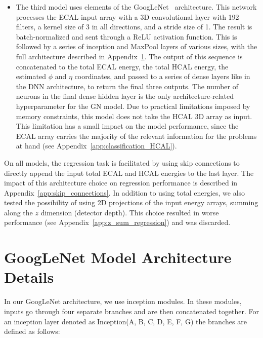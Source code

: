 \begin{itemize}
    \item The third model uses elements of the GoogLeNet~\cite{GoogLeNet} architecture. This network processes the ECAL input array with a 3D convolutional layer with 192 filters, a kernel size of 3 in all directions, and a stride size of 1. The result is batch-normalized and sent through a ReLU activation function. This is followed by a series of inception and MaxPool layers of various sizes, with the full architecture described in Appendix~\ref{app:GoogLeNet}. The output of this sequence is concatenated to the total ECAL energy, the total HCAL energy, the estimated $\phi$ and $\eta$ coordinates, and passed to a series of dense layers like in the DNN architecture, to return the final three outputs. The number of neurons in the final dense hidden layer is the only architecture-related hyperparameter for the GN model. Due to practical limitations imposed by memory constraints, this model does not take the HCAL 3D array as input. This limitation has a small impact on the model performance, since the ECAL array carries the majority of the relevant information for the problems at hand (see Appendix~\ref{app:classification_HCAL}).
\end{itemize}

On all models, the regression task is facilitated by using skip connections to directly append the input total ECAL and HCAL energies to the last layer. The impact of this architecture choice on regression performance is described in Appendix~\ref{app:skip_connections}. In addition to using total energies, we also tested the possibility of using 2D projections of the input energy arrays, summing along the $z$ dimension (detector depth). This choice resulted in worse performance (see Appendix~\ref{app:z_sum_regression}) and was discarded.

\section{GoogLeNet Model Architecture Details}\label{app:GoogLeNet}

In our GoogLeNet architecture, we use inception modules. In these modules, inputs go through four separate branches and are then concatenated together. For an inception layer denoted as Inception(A, B, C, D, E, F, G) the branches are defined as follows:

